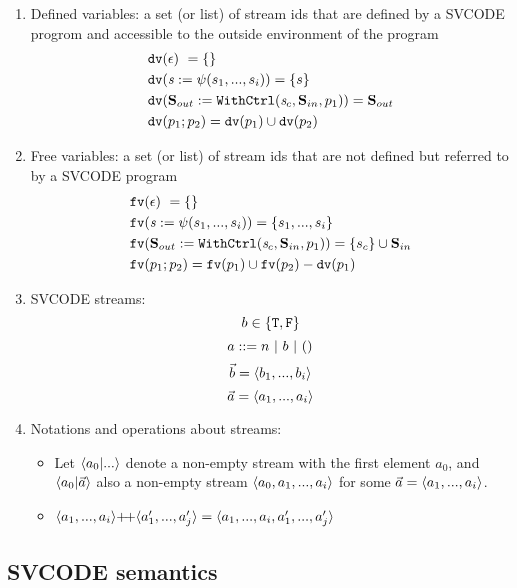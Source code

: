 \begin{enumerate}[(1)]
\begin{itemize}
 \end{itemize}



\item Defined variables: a set (or list) of stream ids that are defined by a SVCODE progrom and accessible to the outside environment of the program
\begin{align*}
	&\mathtt{dv}(\epsilon) \ = \{\}\\
	&\mathtt{dv}(\mathit{s} := \psi(s_1,...,s_i)) = \{s\}\\
	&\mathtt{dv}(\mathbf{S}_{out} := \mathtt{WithCtrl}(\mathit{s}_c,\mathbf{S}_{in},p_1))  = \mathbf{S}_{out} \\
	&\mathtt{dv}(p_1;p_2) = \mathtt{dv}(p_1) \cup \mathtt{dv}(p_2)
\end{align*}


\item Free variables: a set (or list) of stream ids that are not defined but referred to by a SVCODE program
\begin{align*}
	&\mathtt{fv}(\epsilon) \ = \{\}\\
	&\mathtt{fv}(\mathit{s} := \psi(s_1,...,s_i)) = \{s_1,...,s_i\}\\
	&\mathtt{fv}(\mathbf{S}_{out} := \mathtt{WithCtrl}(\mathit{s}_c,\mathbf{S}_{in},p_1))  = \{s_c\} \cup \mathbf{S}_{in} \\
	&\mathtt{fv}(p_1;p_2) = \mathtt{fv}(p_1) \cup \mathtt{fv}(p_2) - \mathtt{dv}(p_1) 
\end{align*}


\item SVCODE streams: 
$$b \in \{\mathtt{T},\mathtt{F} \}$$
$$ a ::= n \ | \ b \ | \ \unit$$
$$\vec b = \langle b_1,...,b_i \rangle$$ 
$$\vec a = \langle a_1,...,a_i \rangle  $$


\item Notations and operations about streams:
\begin{itemize}
	\item  Let $\< a_0 | ... \'>$ denote a non-empty stream with the first element $a_0$, and $\< a_0 | \a \'>$ also a non-empty stream $\< a_0,a_1,...,a_i \'>$ for some $\a = \< a_1,...,a_i \'>$. 

	\item $\vapp{\vrange{a_1}{a_i}} {\vrange{a_1'}{a_j'}} = \langle a_1,...,a_i,a_1',...,a_j' \rangle $ \\

\end{itemize}

\end{enumerate}

\subsection{SVCODE semantics}


